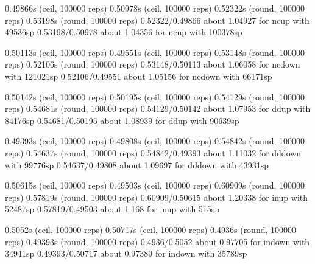 0.49866s (ceil, 100000 reps)                            0.50978s (ceil, 100000 reps)                           
0.52322s (round, 100000 reps)                           0.53198s (round, 100000 reps)                          
0.52322/0.49866 about 1.04927 for ncup with 49536sp     0.53198/0.50978 about 1.04356 for ncup with 100378sp   
                                                                                                               
0.50113s (ceil, 100000 reps)                            0.49551s (ceil, 100000 reps)                           
0.53148s (round, 100000 reps)                           0.52106s (round, 100000 reps)                          
0.53148/0.50113 about 1.06058 for ncdown with 121021sp  0.52106/0.49551 about 1.05156 for ncdown with 66171sp  
                                                                                                               
0.50142s (ceil, 100000 reps)                            0.50195s (ceil, 100000 reps)                           
0.54129s (round, 100000 reps)                           0.54681s (round, 100000 reps)                          
0.54129/0.50142 about 1.07953 for ddup with 84176sp     0.54681/0.50195 about 1.08939 for ddup with 90639sp    
                                                                                                               
0.49393s (ceil, 100000 reps)                            0.49808s (ceil, 100000 reps)                           
0.54842s (round, 100000 reps)                           0.54637s (round, 100000 reps)                          
0.54842/0.49393 about 1.11032 for dddown with 99776sp   0.54637/0.49808 about 1.09697 for dddown with 43931sp  
                                                                                                               
0.50615s (ceil, 100000 reps)                            0.49503s (ceil, 100000 reps)                           
0.60909s (round, 100000 reps)                           0.57819s (round, 100000 reps)                          
0.60909/0.50615 about 1.20338 for inup with 52487sp     0.57819/0.49503 about 1.168 for inup with 515sp        
                                                                                                               
0.5052s (ceil, 100000 reps)                             0.50717s (ceil, 100000 reps)                           
0.4936s (round, 100000 reps)                            0.49393s (round, 100000 reps)                          
0.4936/0.5052 about 0.97705 for indown with 34941sp     0.49393/0.50717 about 0.97389 for indown with 35789sp  
                                                                                                               
